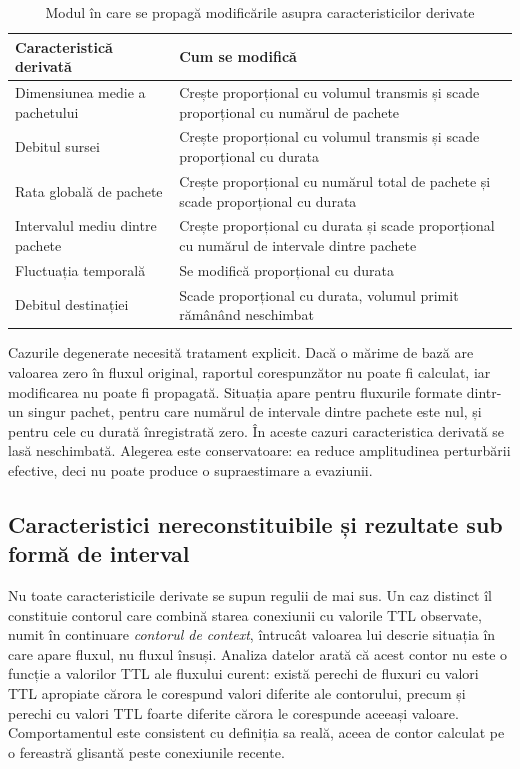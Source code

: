 \begin{table}[!ht]
    \caption{Modul în care se propagă modificările asupra caracteristicilor derivate}
    \centering
    \begin{tabular}{|l|p{7.2cm}|}
        \hline
        \textbf{Caracteristică derivată} & \textbf{Cum se modifică} \\
        \hline
        Dimensiunea medie a pachetului & Crește proporțional cu volumul transmis și scade proporțional cu numărul de pachete \\
        \hline
        Debitul sursei & Crește proporțional cu volumul transmis și scade proporțional cu durata \\
        \hline
        Rata globală de pachete & Crește proporțional cu numărul total de pachete și scade proporțional cu durata \\
        \hline
        Intervalul mediu dintre pachete & Crește proporțional cu durata și scade proporțional cu numărul de intervale dintre pachete \\
        \hline
        Fluctuația temporală & Se modifică proporțional cu durata \\
        \hline
        Debitul destinației & Scade proporțional cu durata, volumul primit rămânând neschimbat \\
        \hline
    \end{tabular}
    \label{tab:propagare}
\end{table}

Cazurile degenerate necesită tratament explicit. Dacă o mărime de bază are valoarea zero în fluxul original, raportul corespunzător nu poate fi calculat, iar modificarea nu poate fi propagată. Situația apare pentru fluxurile formate dintr-un singur pachet, pentru care numărul de intervale dintre pachete este nul, și pentru cele cu durată înregistrată zero. În aceste cazuri caracteristica derivată se lasă neschimbată. Alegerea este conservatoare: ea reduce amplitudinea perturbării efective, deci nu poate produce o supraestimare a evaziunii.

\subsection{Caracteristici nereconstituibile și rezultate sub formă de interval}\label{subsec:interval}

Nu toate caracteristicile derivate se supun regulii de mai sus. Un caz distinct îl constituie contorul care combină starea conexiunii cu valorile TTL observate, numit în continuare \emph{contorul de context}, întrucât valoarea lui descrie situația în care apare fluxul, nu fluxul însuși. Analiza datelor arată că acest contor nu este o funcție a valorilor TTL ale fluxului curent: există perechi de fluxuri cu valori TTL apropiate cărora le corespund valori diferite ale contorului, precum și perechi cu valori TTL foarte diferite cărora le corespunde aceeași valoare. Comportamentul este consistent cu definiția sa reală, aceea de contor calculat pe o fereastră glisantă peste conexiunile recente.

